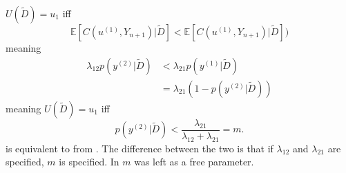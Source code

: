 \begin{example}
	$U(\tilde{D})=u_1$ iff
	\begin{equation}
		\mathbb{E}[C(u^{(1)},Y_{n+1})|\tilde{D}]<\mathbb{E}[C(u^{(1)},Y_{n+1})|\tilde{D}])
	\end{equation}
	meaning
	\begin{equation}
		\begin{split}
			\lambda_{12}p(y^{(2)}|\tilde{D})&<\lambda_{21}p(y^{(1)}|\tilde{D})\\
			&=\lambda_{21}(1-p(y^{(2)}|\tilde{D}))
		\end{split}
	\end{equation}
	meaning $U(\tilde{D}) = u_1$ iff
	\begin{equation}
		p(y^{(2)}|\tilde{D})<\frac{\lambda_{21}}{\lambda_{12}+\lambda_{21}}=m.
		\label{eq:threshold31}
	\end{equation}
	 is equivalent to  from . The difference between the two is that if $\lambda_{12}$ and $\lambda_{21}$ are specified, $m$ is specified. In  $m$ was left as a free parameter.
\end{example}


